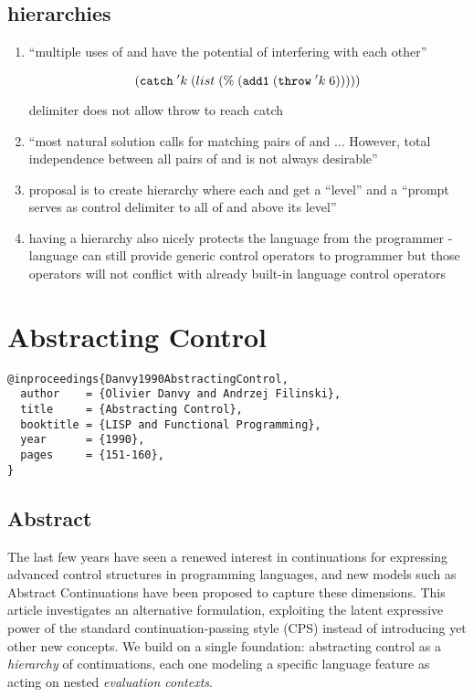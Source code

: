 \documentclass[letterpaper]{llncs}
\begin{document}
\subsection*{hierarchies}
\begin{enumerate}
	\item ``multiple uses of \ctrl and \run have the potential of interfering with each other''
	
	$$ (  \texttt{catch}  \;    'k  \;   ( list \;   ( \% \;   ( \texttt{add1} \;   ( \texttt{throw} \;   'k \; 6   )   )   )   )     ) $$
	
	delimiter does not allow throw to reach catch
	\item ``most natural solution calls for matching pairs of \ctrl and \run $\ldots$ However, total independence between all pairs of \ctrl and \run is not always desirable''
	\item proposal is to create hierarchy where each \ctrl and \run get a ``level'' and a ``prompt serves as control delimiter to all \ctrl of and above its level''
	\item having a hierarchy also nicely protects the language from the programmer - language can still provide generic control operators to programmer but those operators will not conflict with already built-in language control operators
	
\end{enumerate}


\section*{Abstracting Control}%

\begin{verbatim}
@inproceedings{Danvy1990AbstractingControl,
  author    = {Olivier Danvy and Andrzej Filinski},
  title     = {Abstracting Control},
  booktitle = {LISP and Functional Programming},
  year      = {1990},
  pages     = {151-160},
}
\end{verbatim}


\subsection*{Abstract}
The last few years have seen a renewed interest in continuations for expressing advanced control structures in programming languages, and new models such as Abstract Continuations have been proposed to capture these dimensions. This article investigates an alternative formulation, exploiting the latent expressive power of the standard continuation-passing style (CPS) instead of introducing yet other new concepts. We build on a single foundation: abstracting control as a \textit{hierarchy} of continuations, each one modeling a specific language feature as acting on nested \textit{evaluation contexts}. 
\end{document}
